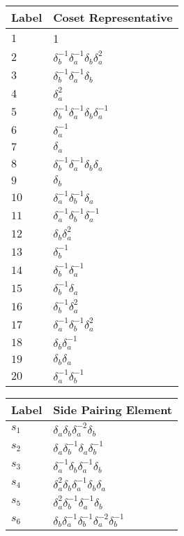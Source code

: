 \documentclass{article}
\begin{document}
\begin{center}
\begin{tabular}{ll}
\toprule
Label & Coset Representative\\
\midrule
$1$ & 1 \\
$2$ & $\delta_b^{-1}\delta_a^{-1}\delta_b^{}\delta_a^{2}$ \\
$3$ & $\delta_b^{-1}\delta_a^{-1}\delta_b^{}$ \\
$4$ & $\delta_a^{2}$ \\
$5$ & $\delta_b^{-1}\delta_a^{-1}\delta_b^{}\delta_a^{-1}$ \\
$6$ & $\delta_a^{-1}$ \\
$7$ & $\delta_a^{}$ \\
$8$ & $\delta_b^{-1}\delta_a^{-1}\delta_b^{}\delta_a^{}$ \\
$9$ & $\delta_b^{}$ \\
$10$ & $\delta_a^{-1}\delta_b^{-1}\delta_a^{}$ \\
$11$ & $\delta_a^{-1}\delta_b^{-1}\delta_a^{-1}$ \\
$12$ & $\delta_b^{}\delta_a^{2}$ \\
$13$ & $\delta_b^{-1}$ \\
$14$ & $\delta_b^{-1}\delta_a^{-1}$ \\
$15$ & $\delta_b^{-1}\delta_a^{}$ \\
$16$ & $\delta_b^{-1}\delta_a^{2}$ \\
$17$ & $\delta_a^{-1}\delta_b^{-1}\delta_a^{2}$ \\
$18$ & $\delta_b^{}\delta_a^{-1}$ \\
$19$ & $\delta_b^{}\delta_a^{}$ \\
$20$ & $\delta_a^{-1}\delta_b^{-1}$ \\
\bottomrule
\end{tabular}
\hfill
\begin{tabular}{ll}
\toprule
Label & Side Pairing Element\\
\midrule
$s_{1}$ & $\delta_a^{}\delta_b^{}\delta_a^{-2}\delta_b^{}$ \\
$s_{2}$ & $\delta_a^{}\delta_b^{-1}\delta_a^{}\delta_b^{-1}$ \\
$s_{3}$ & $\delta_a^{-1}\delta_b^{}\delta_a^{-1}\delta_b^{}$ \\
$s_{4}$ & $\delta_a^{2}\delta_b^{}\delta_a^{-1}\delta_b^{}\delta_a^{}$ \\
$s_{5}$ & $\delta_a^{2}\delta_b^{-1}\delta_a^{-1}\delta_b^{}$ \\
$s_{6}$ & $\delta_b^{}\delta_a^{-1}\delta_b^{-1}\delta_a^{-2}\delta_b^{-1}$ \\

\end{tabular}
\end{center}
\end{document}

